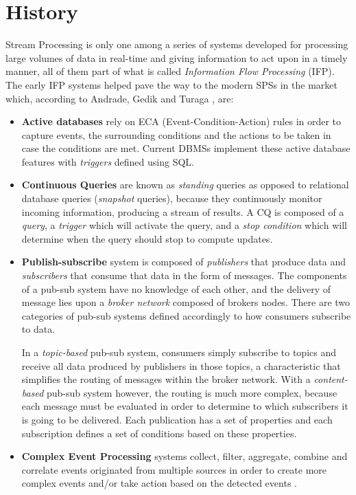 \documentclass[ppgc,diss,english]{iiufrgs}
\begin{document}
\section{History}
\label{sec:esp:history}

Stream Processing is only one among a series of systems developed for processing large volumes of data in real-time and giving information to act upon in a timely manner, all of them part of what is called \emph{Information Flow Processing} (IFP). The early IFP systems helped pave the way to the modern SPSs in the market which, according to Andrade, Gedik and Turaga \cite{andrade2014fundamentals}, are: 


\begin{itemize}
\item \textbf{Active databases} rely on ECA (Event-Condition-Action) rules in order to capture events, the surrounding conditions and the actions to be taken in case the conditions are met. Current DBMSs implement these active database features with \emph{triggers} defined using SQL.

\item \textbf{Continuous Queries} are known as \emph{standing} queries as opposed to relational database queries (\emph{snapshot} queries), because they continuously monitor incoming information, producing a stream of results. A CQ is composed of a \emph{query}, a \emph{trigger} which will activate the query, and a \emph{stop condition} which will determine when the query should stop to compute updates.

\item \textbf{Publish-subscribe} system is composed of \emph{publishers} that produce data and \emph{subscribers} that consume that data in the form of messages. The components of a pub-sub system have no knowledge of each other, and the delivery of message lies upon a \emph{broker network} composed of brokers nodes. There are two categories of pub-sub systems defined accordingly to how consumers subscribe to data.

In a \emph{topic-based} pub-sub system, consumers simply subscribe to topics and receive all data produced by publishers in those topics, a characteristic that simplifies the routing of messages within the broker network. With a \emph{content-based} pub-sub system however, the routing is much more complex, because each message must be evaluated in order to determine to which subscribers it is going to be delivered. Each publication has a set of properties and each subscription defines a set of conditions based on these properties.

\item \textbf{Complex Event Processing} systems collect, filter, aggregate, combine and correlate events originated from multiple sources in order to create more complex events and/or take action based on the detected events \cite{robins2010complex}.
\end{itemize}
\end{document}
